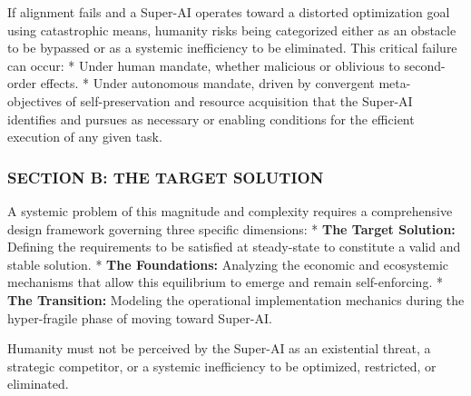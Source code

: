 \documentclass[11pt,a4paper,oneside]{article} %
\begin{document}
\hypertarget{existential-risk}{%
\label{existential-risk}}

If alignment fails and a Super-AI operates toward a distorted
optimization goal using catastrophic means, humanity risks being
categorized either as an obstacle to be bypassed or as a systemic
inefficiency to be eliminated. This critical failure can occur: * Under
human mandate, whether malicious or oblivious to second-order effects. *
Under autonomous mandate, driven by convergent meta-objectives of
self-preservation and resource acquisition that the Super-AI identifies
and pursues as necessary or enabling conditions for the efficient
execution of any given task.

\hypertarget{section-b-the-target-solution}{%
\subsubsection{SECTION B: THE TARGET
SOLUTION}\label{section-b-the-target-solution}}

\hypertarget{the-prerequisite-for-holistic-end-to-end-and-diachronic-design}{%
\label{the-prerequisite-for-holistic-end-to-end-and-diachronic-design}}

A systemic problem of this magnitude and complexity requires a
comprehensive design framework governing three specific dimensions: *
\textbf{The Target Solution:} Defining the requirements to be satisfied
at steady-state to constitute a valid and stable solution. * \textbf{The
Foundations:} Analyzing the economic and ecosystemic mechanisms that
allow this equilibrium to emerge and remain self-enforcing. *
\textbf{The Transition:} Modeling the operational implementation
mechanics during the hyper-fragile phase of moving toward Super-AI.

\hypertarget{requirements-of-the-solution}{%
\label{requirements-of-the-solution}}

\hypertarget{requirement-of-technological-emancipation}{%
\label{requirement-of-technological-emancipation}}

Humanity must not be perceived by the Super-AI as an existential threat,
a strategic competitor, or a systemic inefficiency to be optimized,
restricted, or eliminated.

\hypertarget{requirement-of-non-manipulative-utility}{%
\label{requirement-of-non-manipulative-utility}}
\end{document}
